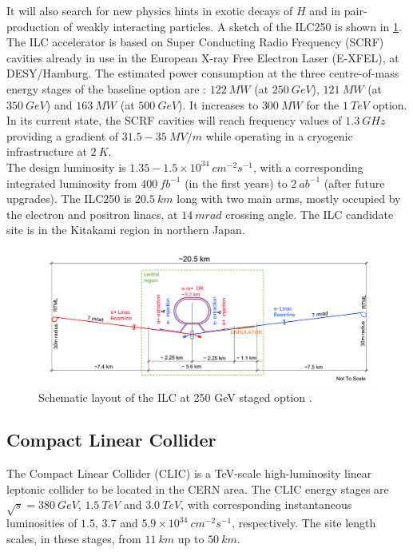 It will also search for new physics hints in exotic decays of $H$ and in pair-production of weakly interacting particles. A sketch of the ILC250 is shown in \ref{fig:ILC250}.\\
The ILC accelerator is based on Super Conducting Radio Frequency (SCRF) cavities already in use in the European X-ray Free Electron Laser (E-XFEL), at DESY/Hamburg.
The estimated power consumption at the three centre-of-mass energy stages of the baseline option are \cite{ILC_design}: $122\ MW$ (at $250\ GeV$), $121\ MW$ (at $350\ GeV$) and $163\ MW$ (at $500\ GeV$). It increases to $300\ MW$ for the $1\ TeV$ option.\\
In its current state, the SCRF cavities will reach frequency values of $1.3\ GHz$ providing a gradient of $31.5-35\ MV/m$ while operating in a cryogenic infrastructure at $2\ K$.\\
The design luminosity is $1.35-1.5 \times 10^{34}\ cm^{-2}s^{-1}$, with a corresponding integrated luminosity from $400\ fb^{-1}$ (in the first years) to $2\ ab^{-1}$ (after future upgrades).
The ILC250 is $20.5\ km$ long with two main arms, mostly occupied by the electron and positron linacs, at $14\ mrad$ crossing angle. The ILC candidate site is in the Kitakami region in northern Japan.

\begin{figure}
	\centering
	\includegraphics[width=.8\textwidth]{IMG/Cap1/ILC.png}
	\caption{Schematic layout of the ILC at 250 GeV staged option \cite{ILC_global_project}.}
	\label{fig:ILC250}
\end{figure}

\subsection*{Compact Linear Collider}
The Compact Linear Collider (CLIC) is a TeV-scale high-luminosity linear leptonic collider to be located in the CERN area. The CLIC energy stages are $\sqrt{s}= 380\ GeV$, $1.5\ TeV$ and $3.0\ TeV$, with corresponding instantaneous luminosities of $1.5$, $3.7$ and $5.9 \times 10^{34}\ cm^{-2}s^{-1}$, respectively. The site length scales, in these stages, from $11\ km$ up to $50\ km$.\\

